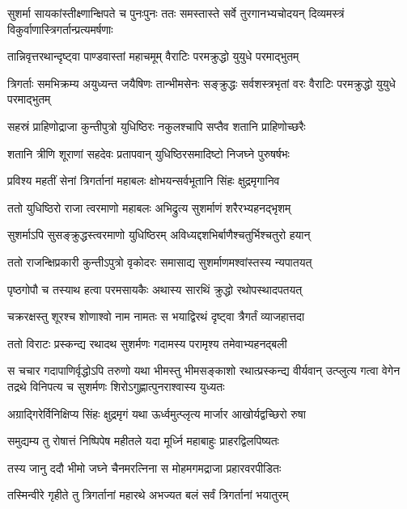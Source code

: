 \onelineshloka
{सुशर्मा सायकांस्तीक्ष्णान्क्षिपते च पुनःपुनः}
\twolineshloka
{ततः समस्तास्ते सर्वे तुरगानभ्यचोदयन्}
{दिव्यमस्त्रं विकुर्वाणास्त्रिगर्तान्प्रत्यमर्षणाः}


\twolineshloka
{तान्निवृत्तरथान्दृष्ट्वा पाण्डवास्तां महाचमूम्}
{वैराटिः परमक्रुद्धो युयुधे परमाद्भुतम्}


\threelineshloka
{त्रिगर्ताः समभिक्रम्य अयुध्यन्त जयैषिणः}
{तान्भीमसेनः सङ्क्रुद्धः सर्वशस्त्रभृतां वरः}
{वैराटिः परमक्रुद्धो युयुधे परमाद्भुतम्}


\twolineshloka
{सहस्रं प्राहिणोद्राजा कुन्तीपुत्रो युधिष्ठिरः}
{नकुलश्चापि सप्तैव शतानि प्राहिणोच्छरैः}


\twolineshloka
{शतानि त्रीणि शूराणां सहदेवः प्रतापवान्}
{युधिष्ठिरसमादिष्टो निजघ्ने पुरुषर्षभः}


\twolineshloka
{प्रविश्य महतीं सेनां त्रिगर्तानां महाबलः}
{क्षोभयन्सर्वभूतानि सिंहः क्षुद्रमृगानिव}


\twolineshloka
{ततो युधिष्ठिरो राजा त्वरमाणो महाबलः}
{अभिद्रुत्य सुशर्माणं शरैरभ्यहनद्भृशम्}


\twolineshloka
{सुशर्माऽपि सुसङ्क्रुद्धस्त्वरमाणो युधिष्ठिरम्}
{अविध्यद्दशभिर्बाणैश्चतुर्भिश्चतुरो हयान्}


\twolineshloka
{ततो राजन्क्षिप्रकारी कुन्तीऽपुत्रो वृकोदरः}
{समासाद्य सुशर्माणमश्वांस्तस्य न्यपातयत्}


\twolineshloka
{पृष्ठगोपौ च तस्याथ हत्वा परमसायकैः}
{अथास्य सारथिं क्रुद्धो रथोपस्थादपतयत्}


\twolineshloka
{चक्ररक्षस्तु शूरश्च शोणाश्वो नाम नामतः}
{स भयाद्विरथं दृष्ट्वा त्रैगर्तं व्याजहात्तदा}


\twolineshloka
{ततो विराटः प्रस्कन्द्य रथादथ सुशर्मणः}
{गदामस्य परामृश्य तमेवाभ्यहनद्बली}


\onelineshloka
{स चचार गदापाणिर्वृद्धोऽपि तरुणो यथा}
\threelineshloka
{भीमस्तु भीमसङ्काशो रथात्प्रस्कन्द्य वीर्यवान्}
{उत्प्लुत्य गत्वा वेगेन तद्रथे विनिपत्य च}
{सुशर्मणः शिरोऽगुह्णात्पुनराश्वास्य युध्यतः}


\twolineshloka
{अग्राद्गिरेर्विनिक्षिप्य सिंहः क्षुद्रमृगं यथा}
{ऊर्ध्वमुत्प्लृत्य मार्जार आखोर्यद्वच्छिरो रुषा}


\twolineshloka
{समुद्यम्य तु रोषात्तं निष्पिपेष महीतले}
{यदा मूर्ध्नि महाबाहुः प्राहरद्विलपिष्यतः}


\twolineshloka
{तस्य जानु ददौ भीमो जघ्ने चैनमरत्निना}
{स मोहमगमद्राजा प्रहारवरपीडितः}


\twolineshloka
{तस्मिन्वीरे गृहीते तु त्रिगर्तानां महारथे}
{अभज्यत बलं सर्वं त्रिगर्तानां भयातुरम्}


